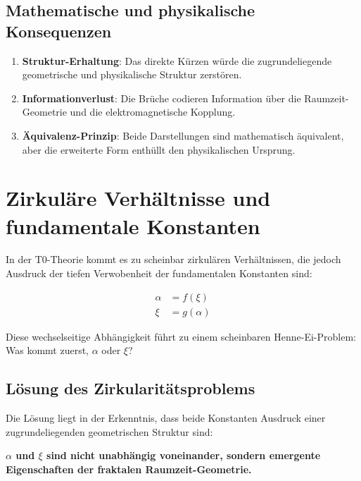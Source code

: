 	\subsection*{Mathematische und physikalische Konsequenzen}
	
	\begin{enumerate}
		\item \textbf{Struktur-Erhaltung}: Das direkte Kürzen würde die zugrundeliegende geometrische und physikalische Struktur zerstören.
		
		\item \textbf{Informationverlust}: Die Brüche codieren Information über die Raumzeit-Geometrie und die elektromagnetische Kopplung.
		
		\item \textbf{Äquivalenz-Prinzip}: Beide Darstellungen sind mathematisch äquivalent, aber die erweiterte Form enthüllt den physikalischen Ursprung.
	\end{enumerate}
	
	\section{Zirkuläre Verhältnisse und fundamentale Konstanten}
\label{sec:zirkulaer}

In der T0-Theorie kommt es zu scheinbar zirkulären Verhältnissen, die jedoch Ausdruck der tiefen Verwobenheit der fundamentalen Konstanten sind:

\begin{align*}
	\alpha &= f(\xi) \\
	\xi &= g(\alpha)
\end{align*}

Diese wechselseitige Abhängigkeit führt zu einem scheinbaren Henne-Ei-Problem: Was kommt zuerst, $\alpha$ oder $\xi$?

\subsection{Lösung des Zirkularitätsproblems}

Die Lösung liegt in der Erkenntnis, dass beide Konstanten Ausdruck einer zugrundeliegenden geometrischen Struktur sind:

\begin{tcolorbox}[colback=green!5!white,colframe=green!75!black]
	\textbf{$\alpha$ und $\xi$ sind nicht unabhängig voneinander, sondern emergente Eigenschaften der fraktalen Raumzeit-Geometrie.}
\end{tcolorbox}

